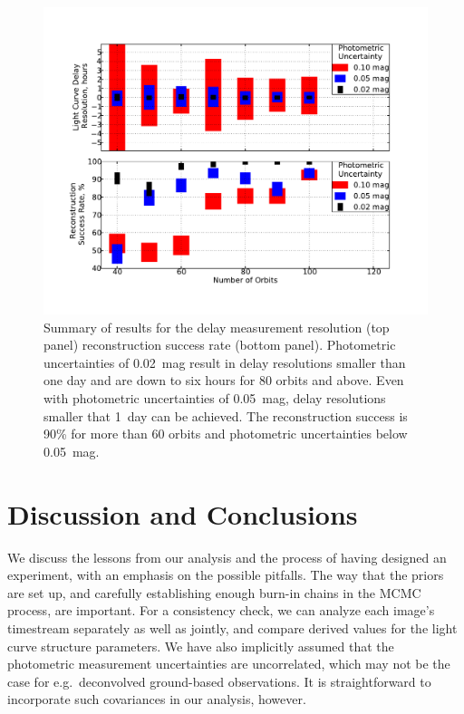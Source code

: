 \documentclass{emulateapj}
\begin{document}
\begin{figure}[t]
\begin{center}
\includegraphics[width=\linewidth]{./systematics_smy.pdf}
\caption{Summary of results for the delay measurement resolution (top
  panel) reconstruction success rate (bottom panel). Photometric
  uncertainties of 0.02~mag result in delay resolutions smaller than
  one day and are down to six hours for 80 orbits and above. Even with
  photometric uncertainties of 0.05~mag, delay resolutions smaller
  that 1~day can be achieved. The reconstruction success is 90\% for
  more than 60 orbits and photometric uncertainties below
  0.05~mag.}\label{fig:summary}
\end{center}
\end{figure}

\section{Discussion and Conclusions}\label{sec:discussion}

We discuss the lessons from our analysis and the process of having
designed an experiment, with an emphasis on the possible pitfalls. The
way that the priors are set up, and carefully establishing enough
burn-in chains in the MCMC process, are important.  For a consistency
check, we can analyze each image's timestream separately as well as
jointly, and compare derived values for the light curve structure
parameters. We have also implicitly assumed that the photometric
measurement uncertainties are uncorrelated, which may not be the case
for e.g.\ deconvolved ground-based observations. It is straightforward
to incorporate such covariances in our analysis, however. 
\end{document}

